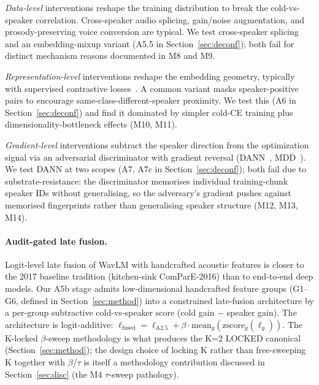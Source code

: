 \textit{Data-level} interventions reshape the training distribution to break the cold-vs-speaker correlation. Cross-speaker audio splicing, gain/noise augmentation, and prosody-preserving voice conversion are typical. We test cross-speaker splicing and an embedding-mixup variant (A5.5 in Section~\ref{sec:deconf}); both fail for distinct mechanism reasons documented in M8 and M9.

\textit{Representation-level} interventions reshape the embedding geometry, typically with supervised contrastive losses~\cite{khosla2020supcon}. A common variant masks speaker-positive pairs to encourage same-class-different-speaker proximity. We test this (A6 in Section~\ref{sec:deconf}) and find it dominated by simpler cold-CE training plus dimensionality-bottleneck effects (M10, M11).

\textit{Gradient-level} interventions subtract the speaker direction from the optimization signal via an adversarial discriminator with gradient reversal (DANN~\cite{ganin2015dann}, MDD~\cite{zhang2019mdd}). We test DANN at two scopes (A7, A7c in Section~\ref{sec:deconf}); both fail due to substrate-resistance: the discriminator memorises individual training-chunk speaker IDs without generalising, so the adversary's gradient pushes against memorised fingerprints rather than generalising speaker structure (M12, M13, M14).

\paragraph{Audit-gated late fusion.} Logit-level late fusion of WavLM with handcrafted acoustic features is closer to the 2017 baseline tradition (kitchen-sink ComParE-2016) than to end-to-end deep models. Our A5b stage admits low-dimensional handcrafted feature groups (G1--G6, defined in Section~\ref{sec:method}) into a constrained late-fusion architecture by a per-group subtractive cold-vs-speaker score (cold gain $-$ speaker gain). The architecture is logit-additive: $\ell_{\text{fused}} = \ell_{\text{A2.5}} + \beta \cdot \mathrm{mean}_g(\mathrm{zscore}_g(\ell_g))$. The K-locked $\beta$-sweep methodology is what produces the K=2 LOCKED canonical (Section~\ref{sec:method}); the design choice of locking K rather than free-sweeping K together with $\beta$/$\tau$ is itself a methodology contribution discussed in Section~\ref{sec:disc} (the M4 $\tau$-sweep pathology).
